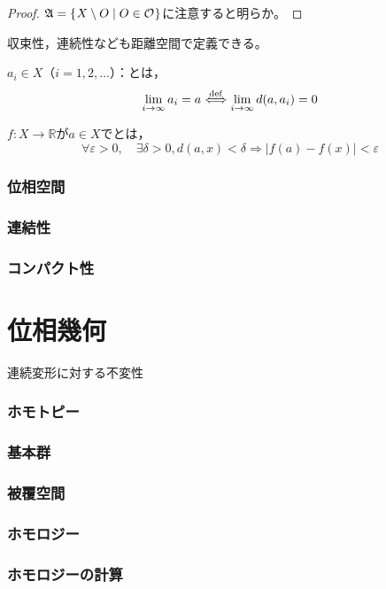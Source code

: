 \documentclass[uplatex]{jsarticle}
\newcommand{\octopuspart}[1]{\newpage\part{#1}\setcounter{section}{0}\vspace{3\baselineskip}}
\begin{document}
\begin{proof}
     $\mathfrak{A} = \Set{\hspace{-1.8pt}  X \setminus O | O \in \mathcal{O} \hspace{-1.8pt}}$に注意すると明らか。


\end{proof}

収束性，連続性なども距離空間で定義できる。

\begin{teigi}
     $a_{i} \in X$（$i=1,2,\dots$）：とは，
    \begin{equation}
        \lim_{i \to \infty} a_{i} = a \overset{\mathrm{def}}{\Longleftrightarrow} \lim_{i \to \infty} d(a, a_{i}) = 0
    \end{equation}
    
     $f:X \longrightarrow \mathbb{R}$が$a \in X$でとは，
    \begin{equation}
        \forall \varepsilon > 0, \quad \exists \delta > 0, d(a,x) < \delta \Longrightarrow \left| f(a) - f(x) \right| < \varepsilon
    \end{equation}
\end{teigi}
\section{位相空間}
\section{連結性}
\section{コンパクト性}

\octopuspart{位相幾何}
連続変形に対する不変性

\section{ホモトピー}
\section{基本群}
\section{被覆空間}
\section{ホモロジー}
\section{ホモロジーの計算}
\end{document}
